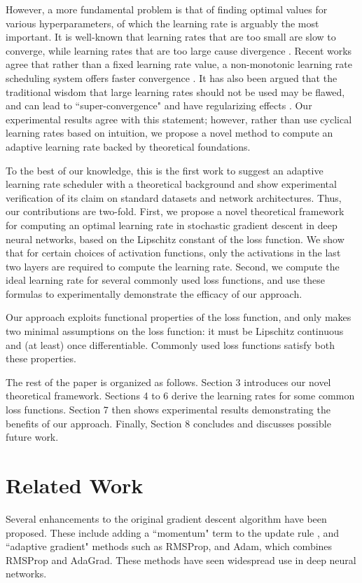\documentclass{article}
\begin{document}
However, a more fundamental problem is that of finding optimal values for various hyperparameters, of which the learning rate is arguably the most important. It is well-known that learning rates that are too small are slow to converge, while learning rates that are too large cause divergence \cite{bengio2012neural}. Recent works agree that rather than a fixed learning rate value, a non-monotonic learning rate scheduling system offers faster convergence \cite{seong2018towards,smith2017cyclical}. It has also been argued that the traditional wisdom that large learning rates should not be used may be flawed, and can lead to ``super-convergence" and have regularizing effects \cite{smith2017super}. Our experimental results agree with this statement; however, rather than use cyclical learning rates based on intuition, we propose a novel method to compute an adaptive learning rate backed by theoretical foundations. 

To the best of our knowledge, this is the first work to suggest an adaptive learning rate scheduler with a theoretical background and show experimental verification of its claim on standard datasets and network architectures. Thus, our contributions are two-fold. First, we propose a novel theoretical framework for computing an optimal learning rate in stochastic gradient descent in deep neural networks, based on the Lipschitz constant of the loss function. We show that for certain choices of activation functions, only the activations in the last two layers are required to compute the learning rate. Second, we compute the ideal learning rate for several commonly used loss functions, and use these formulas to experimentally demonstrate the efficacy of our approach.

Our approach exploits functional properties of the loss function, and only makes two minimal assumptions on the loss function: it must be Lipschitz continuous\cite{saha} and (at least) once differentiable. Commonly used loss functions satisfy both these properties.

The rest of the paper is organized as follows. Section 3 introduces our novel theoretical framework. Sections 4 to 6 derive the learning rates for some common loss functions. Section 7 then shows experimental results demonstrating the benefits of our approach. Finally, Section 8 concludes and discusses possible future work.

\section{Related Work}
Several enhancements to the original gradient descent algorithm have been proposed. These include adding a ``momentum" term to the update rule \cite{sutskever2013importance}, and ``adaptive gradient" methods such as RMSProp\cite{tieleman2012lecture}, and Adam\cite{kingma2014adam}, which combines RMSProp and AdaGrad\cite{duchi2011adaptive}. These methods have seen widespread use in deep neural networks\cite{radford2015unsupervised,xu2015show,bahar2017empirical}.
\end{document}
